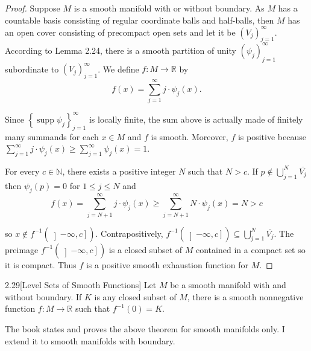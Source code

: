 \begin{proof}
    Suppose \( M \) is a smooth manifold with or without boundary. As \( M \) has a countable basis consisting of regular coordinate balls and half-balls, then \( M \) has an open cover consisting of precompact open sets and let it be \( {(V_{j})}_{j=1}^{\infty} \). According to Lemma 2.24, there is a smooth partition of unity \( {(\psi_{j})}_{j=1}^{\infty} \) subordinate to \({(V_{j})}_{j=1}^{\infty} \). We define \( f: M \to \mathbb{R} \) by
    \[
        f(x) = \sum_{j=1}^{\infty} j \cdot \psi_{j}(x).
    \]

    Since \( {\left\{ \operatorname{supp} \psi_{j} \right\}}_{j=1}^{\infty} \) is locally finite, the sum above is actually made of finitely many summands for each \( x \in M \) and \( f \) is smooth. Moreover, \( f \) is positive because \( \sum_{j=1}^{\infty} j \cdot \psi_{j}(x) \ge \sum_{j=1}^{\infty} \psi_{j}(x) = 1 \).

    For every \( c \in \mathbb{N} \), there exists a positive integer \( N \) such that \( N > c \). If \( p \notin \bigcup_{j=1}^{N} \overline{V_{j}} \) then \( \psi_{j}(p) = 0 \) for \( 1 \le j \le N \) and
    \[
        f(x) = \sum_{j=N+1}^{\infty} j \cdot \psi_{j}(x) \ge \sum_{j=N+1}^{\infty} N \cdot \psi_{j}(x) = N > c
    \]

    so \( x \notin f^{-1}(\left\rbrack -\infty, c \right\rbrack) \). Contrapositively, \( f^{-1}(\left\rbrack -\infty, c \right\rbrack) \subseteq \bigcup_{j=1}^{N} \overline{V_{j}} \). The preimage \( f^{-1}(\left\rbrack -\infty, c \right\rbrack) \) is a closed subset of \( M \) contained in a compact set so it is compact. Thus \( f \) is a positive smooth exhaustion function for \( M \).
\end{proof}

\begin{theorem}{2.29}[Level Sets of Smooth Functions]
    Let \( M \) be a smooth manifold {\color{red}with and without boundary}. If \( K \) is any closed subset of \( M \), there is a smooth nonnegative function \( f: M \to \mathbb{R} \) such that \( f^{-1}(0) = K \).
\end{theorem}

The book states and proves the above theorem for smooth manifolds only. I extend it to smooth manifolds with boundary.

